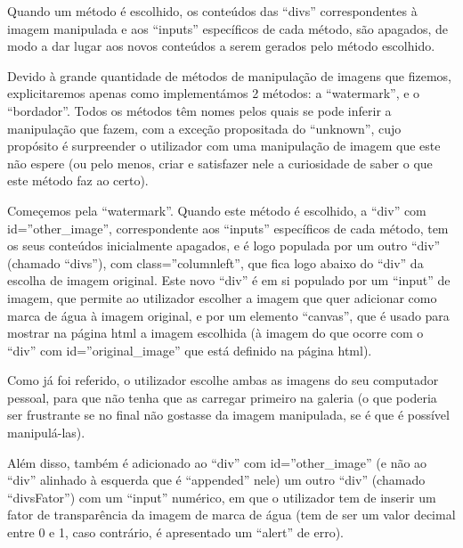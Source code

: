 \documentclass{report}
\begin{document}
\newpage

Quando um método é escolhido, os conteúdos das “divs” correspondentes à imagem manipulada e aos “inputs” específicos de cada método, são apagados, de modo a dar lugar aos novos conteúdos a serem gerados pelo método escolhido.

\linebreak
 \bigskip
 
Devido à grande quantidade de métodos de manipulação de imagens que fizemos, explicitaremos apenas como implementámos 2 métodos: a “watermark”, e o “bordador”. Todos os métodos têm nomes pelos quais se pode inferir a manipulação que fazem, com a exceção propositada do “unknown”, cujo propósito é surpreender o utilizador com uma manipulação de imagem que este não espere (ou pelo menos, criar e satisfazer nele a curiosidade de saber o que este método faz ao certo).

\linebreak
 \bigskip
 
	Começemos pela “watermark”. Quando este método é escolhido, a “div” com id=”other\_image”, correspondente aos “inputs” específicos de cada método, tem os seus conteúdos inicialmente apagados, e é logo populada por um outro “div” (chamado “divs”), com class=”columnleft”, que fica logo abaixo do “div” da escolha de imagem original. Este novo “div” é em si populado por um “input” de imagem, que permite ao utilizador escolher a imagem que quer adicionar como marca de água à imagem original, e por um elemento “canvas”, que é usado para mostrar na página html a imagem escolhida (à imagem do que ocorre com o “div” com id=”original\_image” que está definido na página html).

 \linebreak
 \bigskip
 
	Como já foi referido, o utilizador escolhe ambas as imagens do seu computador pessoal, para que não tenha que as carregar primeiro na galeria (o que poderia ser frustrante se no final não gostasse da imagem manipulada, se é que é possível manipulá-las).

 \linebreak
 \bigskip
 
	Além disso, também é adicionado ao “div” com id=”other\_image” (e não ao “div” alinhado à esquerda que é “appended” nele) um outro “div” (chamado “divsFator”) com um “input” numérico, em que o utilizador tem de inserir um fator de transparência da imagem de marca de água (tem de ser um valor decimal entre 0 e 1, caso contrário, é apresentado um “alert” de erro).
\end{document}
